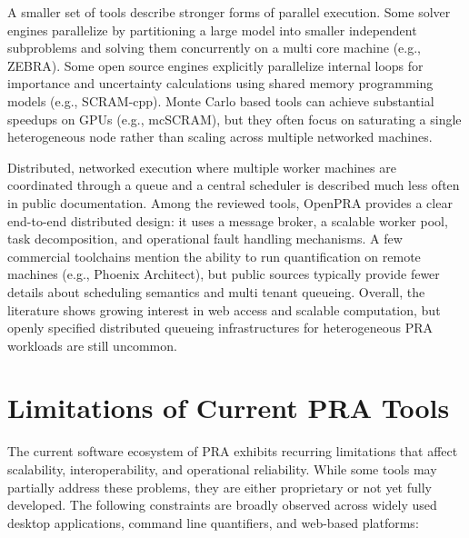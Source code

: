 A smaller set of tools describe stronger forms of parallel execution. Some solver engines parallelize by partitioning a large model into smaller independent subproblems and solving them concurrently on a multi core machine (e.g., ZEBRA). Some open source engines explicitly parallelize internal loops for importance and uncertainty calculations using shared memory programming models (e.g., SCRAM-cpp). Monte Carlo based tools can achieve substantial speedups on GPUs (e.g., mcSCRAM), but they often focus on saturating a single heterogeneous node rather than scaling across multiple networked machines.

Distributed, networked execution where multiple worker machines are coordinated through a queue and a central scheduler is described much less often in public documentation. Among the reviewed tools, OpenPRA provides a clear end-to-end distributed design: it uses a message broker, a scalable worker pool, task decomposition, and operational fault handling mechanisms. A few commercial toolchains mention the ability to run quantification on remote machines (e.g., Phoenix Architect), but public sources typically provide fewer details about scheduling semantics and multi tenant queueing. Overall, the literature shows growing interest in web access and scalable computation, but openly specified distributed queueing infrastructures for heterogeneous PRA workloads are still uncommon.



\section{Limitations of Current PRA Tools}
\label{sec:lr-limitations}

The current software ecosystem of PRA exhibits recurring limitations that affect scalability, interoperability, and operational reliability. While some tools may partially address these problems, they are either proprietary or not yet fully developed. The following constraints are broadly observed across widely used desktop applications, command line quantifiers, and web-based platforms:

